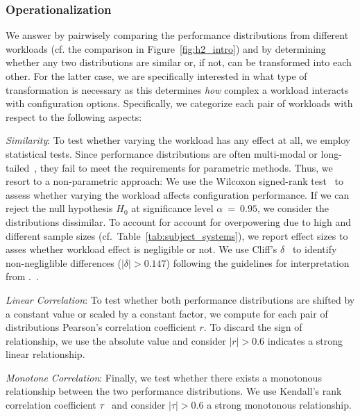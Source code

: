 \subsubsection{Operationalization}
We answer  by pairwisely comparing the performance distributions from different workloads (cf. the comparison in Figure~\ref{fig:h2_intro}) and by determining whether any two distributions are similar or, if not, can be transformed into each other. For the latter case, we are specifically interested in what type of transformation is necessary as this determines \textit{how} complex a workload interacts with configuration options. Specifically, we categorize each pair of workloads with respect to the following aspects: 
\begin{compactenum}
	\item \textit{Similarity}: To test whether varying the workload has any effect at all, we employ statistical tests. Since performance distributions are often multi-modal or long-tailed~\cite{curtsinger_stabilizer_2013,maricq2018taming}, they fail to meet the requirements for parametric methods. 
	Thus, we resort to a non-parametric approach: We use the Wilcoxon signed-rank test~\cite{lovric_international_2010} to assess whether varying the workload affects configuration performance. If we can reject the null hypothesis $H_0$ at significance level $\alpha~=~0.95$, we consider the distributions dissimilar. To account for account for overpowering due to high and different sample sizes (cf.~Table~\ref{tab:subject_systems}), we report effect sizes to asses whether workload effect is negligible or not. We use Cliff's $\delta$~\cite{Cliff1993DominanceSO} to identify non-negliglible differences ($\vert \delta \vert > 0.147$) following the guidelines for interpretation from \citeauthor{romano2006exploring}.~\cite{romano2006exploring}.
	
	\item \textit{Linear Correlation}: To test whether both performance distributions are shifted by a constant value or scaled by a constant factor, we compute for each pair of distributions Pearson's correlation coefficient $r$. To discard the sign of relationship, we use the absolute value and consider $\vert r\vert >0.6$ indicates a strong linear relationship. 
	
	\item \textit{Monotone Correlation}: Finally, we test whether there exists a monotonous relationship between the two performance distributions. We use Kendall's rank correlation coefficient $\tau$~\cite{kendall1938new} and consider $\vert\tau\vert > 0.6$ a strong monotonous relationship.
\end{compactenum}
